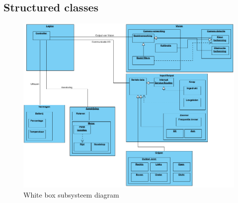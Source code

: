 \documentclass[12pt]{article} %
\begin{document}
\subsection{Structured classes}
\begin{center}
\begin{figure}[h]
\includegraphics[scale=.6]{WhiteBoxDiagram.png}
\caption{White box subsysteem diagram}
\label{fig:deployment}
\end{figure}
\end{center}
\clearpage
\newpage

%

% 
% 
%
\end{document}
